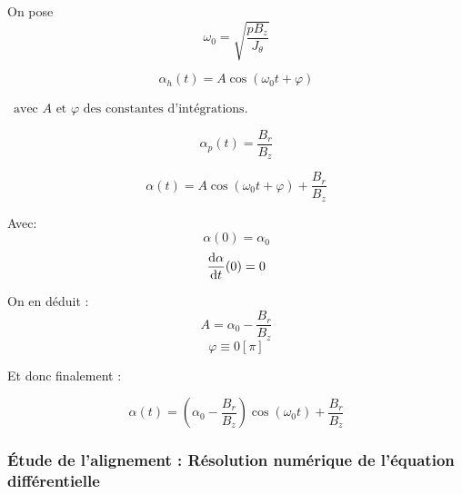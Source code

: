 \documentclass{report}
\begin{document}
On pose $$\omega_0 = \sqrt{\frac{pB_z}{J_\theta}}$$


$$\alpha_h(t) = A \cos(\omega_0 t + \varphi)$$

$\, \text{ avec } A \text{ et } \varphi \text{ des constantes d'intégrations}$.

\newpage
{}

$$\alpha_p(t) = \frac{B_r}{B_z}$$



$$\alpha(t) = A \cos(\omega_0 t + \varphi) + \frac{B_r}{B_z}$$


Avec:
$$\alpha(0) = \alpha_0$$
$$\frac{\mathrm{d}\alpha}{\mathrm{d}t} (0) = 0$$

On en déduit : 
$$A = \alpha_0  - \frac{B_r}{B_z}$$
$$\varphi \equiv 0 \left[\pi\right] $$ 

Et donc finalement :

\begin{prettybox}[blue]
    $$\alpha(t) = \left(\alpha_0  - \frac{B_r}{B_z}\right) \cos(\omega_0 t) + \frac{B_r}{B_z}$$
\end{prettybox}

\subsubsection{Étude de l'alignement : Résolution numérique de l'équation différentielle}
\end{document}
